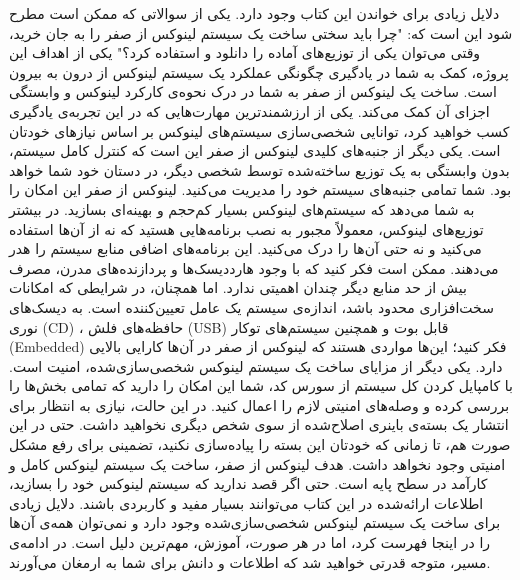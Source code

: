 \documentclass{book}
\begin{document}
دلایل زیادی برای خواندن این کتاب وجود دارد. یکی از سوالاتی که ممکن است مطرح شود این است که: "چرا باید سختی ساخت یک سیستم لینوکس از صفر را به جان خرید، وقتی می‌توان یکی از توزیع‌های آماده را دانلود و استفاده کرد؟"
\newline
\newline
یکی از اهداف این پروژه، کمک به شما در یادگیری چگونگی عملکرد یک سیستم لینوکس از درون به بیرون است. ساخت یک لینوکس از صفر به شما در درک نحوه‌ی کارکرد لینوکس و وابستگی اجزای آن کمک می‌کند. یکی از ارزشمندترین مهارت‌هایی که در این تجربه‌ی یادگیری کسب خواهید کرد، توانایی شخصی‌سازی سیستم‌های لینوکس بر اساس نیازهای خودتان است.
\newline
\newline
یکی دیگر از جنبه‌های کلیدی لینوکس از صفر این است که کنترل کامل سیستم، بدون وابستگی به یک توزیع ساخته‌شده توسط شخصی دیگر، در دستان خود شما خواهد بود. شما تمامی جنبه‌های سیستم خود را مدیریت می‌کنید.
\newline
\newline
لینوکس از صفر این امکان را به شما می‌دهد که سیستم‌های لینوکس بسیار کم‌حجم و بهینه‌ای بسازید. در بیشتر توزیع‌های لینوکس، معمولاً مجبور به نصب برنامه‌هایی هستید که نه از آن‌ها استفاده می‌کنید و نه حتی آن‌ها را درک می‌کنید. این برنامه‌های اضافی منابع سیستم را هدر می‌دهند. ممکن است فکر کنید که با وجود هارددیسک‌ها و پردازنده‌های مدرن، مصرف بیش از حد منابع دیگر چندان اهمیتی ندارد. اما همچنان، در شرایطی که امکانات سخت‌افزاری محدود باشد، اندازه‌ی سیستم یک عامل تعیین‌کننده است. به دیسک‌های نوری (CD) ، حافظه‌های فلش (USB) قابل بوت و همچنین سیستم‌های توکار (Embedded) فکر کنید؛ این‌ها مواردی هستند که لینوکس از صفر در آن‌ها کارایی بالایی دارد.
\newline
\newline
یکی دیگر از مزایای ساخت یک سیستم لینوکس شخصی‌سازی‌شده، امنیت است. با کامپایل کردن کل سیستم از سورس کد، شما این امکان را دارید که تمامی بخش‌ها را بررسی کرده و وصله‌های امنیتی لازم را اعمال کنید. در این حالت، نیازی به انتظار برای انتشار یک بسته‌ی باینری اصلاح‌شده از سوی شخص دیگری نخواهید داشت. حتی در این صورت هم، تا زمانی که خودتان این بسته را پیاده‌سازی نکنید، تضمینی برای رفع مشکل امنیتی وجود نخواهد داشت.
\newline
\newline
هدف لینوکس از صفر، ساخت یک سیستم لینوکس کامل و کارآمد در سطح پایه است. حتی اگر قصد ندارید که سیستم لینوکس خود را بسازید، اطلاعات ارائه‌شده در این کتاب می‌توانند بسیار مفید و کاربردی باشند.
\newline
\newline
دلایل زیادی برای ساخت یک سیستم لینوکس شخصی‌سازی‌شده وجود دارد و نمی‌توان همه‌ی آن‌ها را در اینجا فهرست کرد، اما در هر صورت، آموزش، مهم‌ترین دلیل است. در ادامه‌ی مسیر، متوجه قدرتی خواهید شد که اطلاعات و دانش برای شما به ارمغان می‌آورند.
\end{document}
